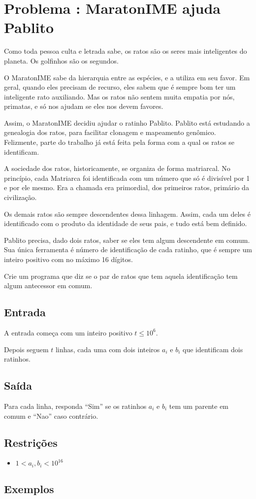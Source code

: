 \section*{Problema \proxLetra: MaratonIME ajuda Pablito}

Como toda pessoa culta e letrada sabe, os ratos são os seres mais inteligentes
do planeta. Os golfinhos são os segundos.

O MaratonIME sabe da hierarquia entre as espécies, e a utiliza em seu favor.
Em geral, quando eles precisam de recurso, eles sabem que é sempre bom ter um
inteligente rato auxiliando. Mas os ratos não sentem muita empatia por nós,
primatas, e só nos ajudam se eles nos devem favores.

Assim, o MaratonIME decidiu ajudar o ratinho Pablito. Pablito está estudando a
genealogia dos ratos, para facilitar clonagem e mapeamento genômico. Felizmente,
parte do trabalho já está feita pela forma com a qual os ratos se identificam.

A sociedade dos ratos, historicamente, se organiza de forma matriarcal. No princípio,
cada Matriarca foi identificada com um número que só é divisível por 1 e por ele mesmo.
Era a chamada era primordial, dos primeiros ratos, primário da civilização.

Os demais ratos são sempre descendentes dessa linhagem. Assim, cada um deles é
identificado com o produto da identidade de seus pais, e tudo está bem definido.

Pablito precisa, dado dois ratos, saber se eles tem algum descendente em comum.
Sua única ferramenta é número de identificação de cada ratinho, que é sempre um
inteiro positivo com no máximo 16 dígitos.

Crie um programa que diz se o par de ratos que tem aquela identificação tem algum
antecessor em comum.

\subsection*{Entrada}

A entrada começa com um inteiro positivo $t \leq 10^6$.

Depois seguem $t$ linhas, cada uma com dois inteiros $a_i$ e $b_i$ que identificam dois ratinhos.
\subsection*{Saída}

Para cada linha, responda ``Sim'' se os ratinhos $a_i$ e $b_i$ tem um parente em comum e ``Nao'' caso contrário.


\subsection*{Restrições}

\begin{itemize}
    \item $1 < a_i, b_i < 10^{16}$
\end{itemize}

\subsection*{Exemplos}
